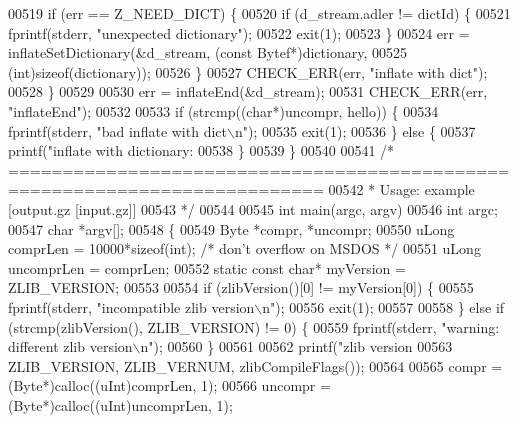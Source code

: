 \begin{DoxyCode}
{{{{{{{{{{{{{{00519         \textcolor{keywordflow}{if} (err == Z\_NEED\_DICT) \{
00520             \textcolor{keywordflow}{if} (d\_stream.adler != dictId) \{
00521                 fprintf(stderr, \textcolor{stringliteral}{"unexpected dictionary"});
00522                 exit(1);
00523             \}
00524             err = inflateSetDictionary(&d\_stream, (\textcolor{keyword}{const} Bytef*)dictionary,
00525                                        (\textcolor{keywordtype}{int})\textcolor{keyword}{sizeof}(dictionary));
00526         \}
00527         CHECK\_ERR(err, \textcolor{stringliteral}{"inflate with dict"});
00528     \}
00529 
00530     err = inflateEnd(&d\_stream);
00531     CHECK\_ERR(err, \textcolor{stringliteral}{"inflateEnd"});
00532 
00533     \textcolor{keywordflow}{if} (strcmp((\textcolor{keywordtype}{char}*)uncompr, hello)) \{
00534         fprintf(stderr, \textcolor{stringliteral}{"bad inflate with dict\(\backslash\)n"});
00535         exit(1);
00536     \} \textcolor{keywordflow}{else} \{
00537         printf(\textcolor{stringliteral}{"inflate with dictionary: %
00538     \}
00539 \}
00540 
00541 \textcolor{comment}{/* ===========================================================================}
00542 \textcolor{comment}{ * Usage:  example [output.gz  [input.gz]]}
00543 \textcolor{comment}{ */}
00544 
00545 \textcolor{keywordtype}{int} main(argc, argv)
00546     \textcolor{keywordtype}{int} argc;
00547     \textcolor{keywordtype}{char} *argv[];
00548 \{
00549     Byte *compr, *uncompr;
00550     uLong comprLen = 10000*\textcolor{keyword}{sizeof}(int); \textcolor{comment}{/* don't overflow on MSDOS */}
00551     uLong uncomprLen = comprLen;
00552     \textcolor{keyword}{static} \textcolor{keyword}{const} \textcolor{keywordtype}{char}* myVersion = ZLIB\_VERSION;
00553 
00554     \textcolor{keywordflow}{if} (zlibVersion()[0] != myVersion[0]) \{
00555         fprintf(stderr, \textcolor{stringliteral}{"incompatible zlib version\(\backslash\)n"});
00556         exit(1);
00557 
00558     \} \textcolor{keywordflow}{else} \textcolor{keywordflow}{if} (strcmp(zlibVersion(), ZLIB\_VERSION) != 0) \{
00559         fprintf(stderr, \textcolor{stringliteral}{"warning: different zlib version\(\backslash\)n"});
00560     \}
00561 
00562     printf(\textcolor{stringliteral}{"zlib version %
00563             ZLIB\_VERSION, ZLIB\_VERNUM, zlibCompileFlags());
00564 
00565     compr    = (Byte*)calloc((uInt)comprLen, 1);
00566     uncompr  = (Byte*)calloc((uInt)uncomprLen, 1);
}}}}}}}}}}}}}}}}
\end{DoxyCode}
